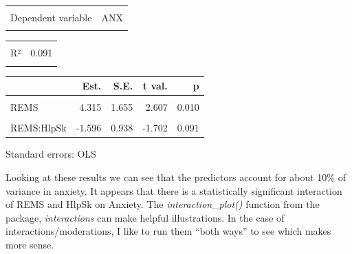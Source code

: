 \documentclass[
  11pt,
]{book}
\begin{document}
\begin{table}[!h]
\centering
\begin{tabular}{lr}
\toprule
\cellcolor{gray!6}{Observations} & \cellcolor{gray!6}{156}\\
Dependent variable & ANX\\
\cellcolor{gray!6}{Type} & \cellcolor{gray!6}{OLS linear regression}\\
\bottomrule
\end{tabular}
\end{table} \begin{table}[!h]
\centering
\begin{tabular}{lr}
\toprule
\cellcolor{gray!6}{F(3,152)} & \cellcolor{gray!6}{5.047}\\
R² & 0.091\\
\cellcolor{gray!6}{Adj. R²} & \cellcolor{gray!6}{0.073}\\
\bottomrule
\end{tabular}
\end{table} \begin{table}[!h]
\centering
\begin{threeparttable}
\begin{tabular}{lrrrr}
\toprule
  & Est. & S.E. & t val. & p\\
\midrule
\cellcolor{gray!6}{(Intercept)} & \cellcolor{gray!6}{1.280} & \cellcolor{gray!6}{0.618} & \cellcolor{gray!6}{2.073} & \cellcolor{gray!6}{0.040}\\
REMS & 4.315 & 1.655 & 2.607 & 0.010\\
\cellcolor{gray!6}{HlpSk} & \cellcolor{gray!6}{0.683} & \cellcolor{gray!6}{0.350} & \cellcolor{gray!6}{1.952} & \cellcolor{gray!6}{0.053}\\
REMS:HlpSk & -1.596 & 0.938 & -1.702 & 0.091\\
\bottomrule
\end{tabular}
\begin{tablenotes}
\item Standard errors: OLS
\end{tablenotes}
\end{threeparttable}
\end{table}

Looking at these results we can see that the predictors account for about 10\% of variance in anxiety. It appears that there is a statistically significant interaction of REMS and HlpSk on Anxiety. The \emph{interaction\_plot()} function from the package, \emph{interactions} can make helpful illustrations. In the case of interactions/moderations, I like to run them ``both ways'' to see which makes more sense.
\end{document}
